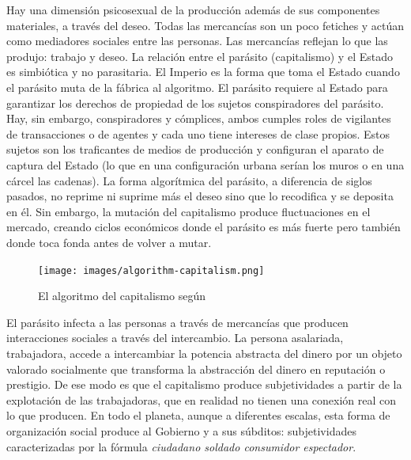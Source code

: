 Hay una dimensión psicosexual de la producción además de sus componentes materiales, a través del deseo. Todas las mercancías son un poco fetiches y actúan como mediadores sociales entre las personas. Las mercancías reflejan lo que las produjo: trabajo y deseo. La relación entre el parásito (capitalismo) y el Estado es simbiótica y no parasitaria. El Imperio es la forma que toma el Estado cuando el parásito muta de la fábrica al algoritmo. El parásito requiere al Estado para garantizar los derechos de propiedad de los sujetos conspiradores del parásito. Hay, sin embargo, conspiradores y cómplices, ambos cumples roles de vigilantes de transacciones o de agentes y cada uno tiene intereses de clase propios. Estos sujetos son los traficantes de medios de producción y configuran el aparato de captura del Estado (lo que en una configuración urbana serían los muros o en una cárcel las cadenas). La forma algorítmica del parásito, a diferencia de siglos pasados, no reprime ni suprime más el deseo sino que lo recodifica y se deposita en él. Sin embargo, la mutación del capitalismo produce fluctuaciones en el mercado, creando ciclos económicos donde el parásito es más fuerte pero también donde toca fonda antes de volver a mutar.

\begin{figure}[htb]
  \centering
  \texttt{[image: images/algorithm-capitalism.png]}
  \caption{El algoritmo del capitalismo según \autocite{AltWokeCompanion2017}}
  \label{fig:algocap}
\end{figure}

El parásito infecta a las personas a través de mercancías que producen interacciones sociales a través del intercambio. La persona asalariada, trabajadora, accede a intercambiar la potencia abstracta del dinero por un objeto valorado socialmente que transforma la abstracción del dinero en reputación o prestigio. De ese modo es que el capitalismo produce subjetividades a partir de la explotación de las trabajadoras, que en realidad no tienen una conexión real con lo que producen. En todo el planeta, aunque a diferentes escalas, esta forma de organización social produce al Gobierno y a sus súbditos: subjetividades caracterizadas por la fórmula \emph{ciudadano soldado consumidor espectador}.

